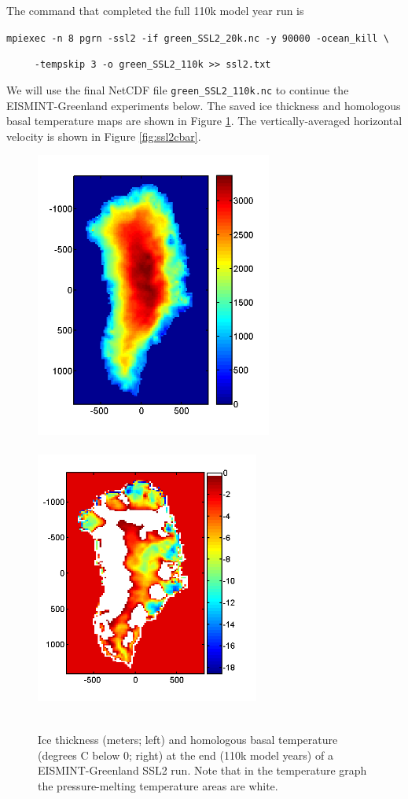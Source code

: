 \documentclass[11pt,final]{amsart}
\begin{document}
The command that completed the full 110k model year run is 

\verb|mpiexec -n 8 pgrn -ssl2 -if green_SSL2_20k.nc -y 90000 -ocean_kill \|

\verb|     -tempskip 3 -o green_SSL2_110k >> ssl2.txt|

We will use the final NetCDF file \verb|green_SSL2_110k.nc| to continue the EISMINT-Greenland experiments below.  The saved ice thickness and homologous basal temperature maps are shown in Figure \ref{fig:ssl2thickThomol}.  The vertically-averaged horizontal velocity is shown in Figure \ref{fig:ssl2cbar}.

\begin{figure}[ht]
\includegraphics[height=3.7in,keepaspectratio=true]{figs/greenH_SSL2}\qquad\includegraphics[height=3.7in,width=2.9in]{figs/greenThomol_SSL2}
\caption{Ice thickness (meters; left) and homologous basal temperature (degrees C below 0; right) at the end (110k model years) of a EISMINT-Greenland SSL2 run.  Note that in the temperature graph the pressure-melting temperature areas are white.}
\label{fig:ssl2thickThomol}
\end{figure}
\end{document}
